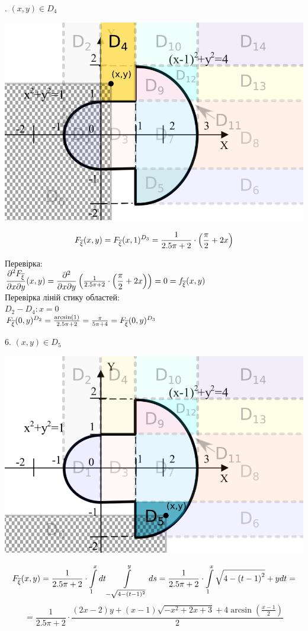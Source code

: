 \documentclass[14pt,a4paper]{scrartcl}
\theoremstyle{definition}
\theoremstyle{remark}
\theoremstyle{definition}
\theoremstyle{definition}
\begin{document}
. $(x,y) \in D_4$
\begin{center} \includegraphics[scale=0.4]{assets/zone655.png} \end{center}
$$
F_{\overline{\xi}} (x,y) =  F_{\overline{\xi}} (x, 1)^{D_3} = \frac{1}{2.5\pi + 2} \cdot \left( \dfrac{\pi}{2}+ 2x\right)
$$

Перевірка:\\
$\dfrac{\partial^2 F_{\overline{\xi}}}{\partial x \partial y}(x,y) =
\dfrac{\partial^2}{\partial x \partial y} \left( \frac{1}{2.5\pi + 2} \cdot \left( \dfrac{\pi}{2}+ 2x\right)
\right) = 0 =f_{\overline{\xi}} (x,y)$\\

Перевірка ліній стику областей:\\
$D_2 - D_4: x = 0$\\
$ F_{\overline{\xi}} (0,y)^{D_2} =\frac{\arcsin(1)}{2.5\pi + 2}   = \frac{\pi}{5\pi + 4} = F_{\overline{\xi}} (0,y)^{D_3}$\\
\newpage

6. $(x,y) \in D_5$
\begin{center} \includegraphics[scale=0.4]{assets/zone54.png} \end{center}
$$
F_{\overline{\xi}} (x,y) = \frac{1}{2.5\pi + 2} \cdot \int\limits_{1}^{x}{dt  \int\limits_{-\sqrt{4 - (t-1)^2}}^{ y}{ds}}   = \frac{1}{2.5\pi + 2} \cdot  \int\limits_{1}^{x}{\sqrt{4-\left(t-1\right)^2}+y dt}  =
$$
$$
=\frac{1}{2.5\pi + 2} \cdot \dfrac{\left(2x-2\right)y+\left(x-1\right)\sqrt{-x^2+2x+3}+4\arcsin\left(\frac{x-1}{2}\right)}{2}
$$
\end{document}
